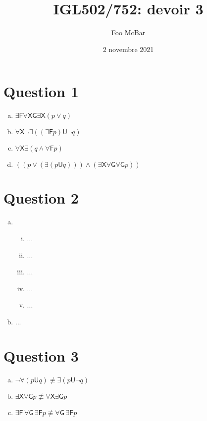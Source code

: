 \documentclass{article}
\title{IGL502/752: devoir 3}
\author{Foo McBar}
\date{2 novembre 2021}
\newcommand{\X}{{\mathsf{X}}}
\newcommand{\F}{{\mathsf{F}}}
\newcommand{\G}{{\mathsf{G}}}
\newcommand{\U}{\mathrel{\mathsf{U}}}
\begin{document}
\maketitle

\section*{Question 1}

\begin{multicols}{2}
  \begin{enumerate}[(a)]
    
  \item $\exists \F \forall \X \G \exists \X (p \lor q)$
    
  \item $\forall \X \neg \exists ((\exists \F p) \U \neg q)$
    
    
  \item $\forall \X \exists (q \land \forall \F p)$
    
  \item $((p \lor (\exists (p \U q))) \land (\exists \X \forall \G
    \forall \G p))$
  \end{enumerate}
\end{multicols}

\section*{Question 2}

\begin{enumerate}[(a)]

\item

  \begin{enumerate}[(i)]
  \item ...
  \item ...
  \item ...
  \item ...
  \item ...
  \end{enumerate}

\item ...

\end{enumerate}

\section*{Question 3}

\begin{enumerate}[(a)]
\item $\neg \forall (p \U q) \not\equiv \exists (p \U \neg q)$
  
\item $\exists \X \forall \G p \not\equiv \forall \X \exists \G p$
  
  
\item $\exists \F\, \forall \G\, \exists \F p \not\equiv \forall \G\,
  \exists \F p$

\end{enumerate}
\end{document}
